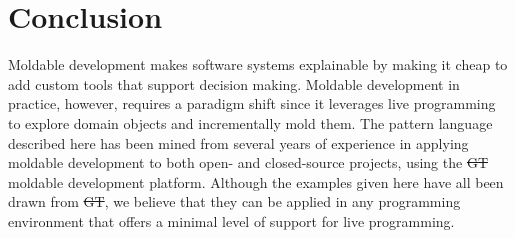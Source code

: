 \documentclass[sigconf]{acmart}
\newcommand{\GT}{\st{GT}\xspace} %
\begin{document}
\section{Conclusion}

Moldable development makes software systems explainable by making it cheap to add custom tools that support decision making.
Moldable development in practice, however, requires a paradigm shift since it leverages live programming to explore domain objects and incrementally mold them.
The pattern language described here has been mined from several years of experience in applying moldable development to both open- and closed-source projects, using the \GT moldable development platform.
Although the examples given here have all been drawn from \GT, we believe that they can be applied in any programming environment that offers a minimal level of support for live programming.



\end{document}
